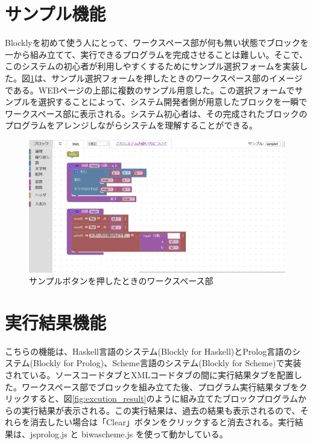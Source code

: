 \documentclass{risepaper}
\begin{document}
   \section{サンプル機能}
Blocklyを初めて使う人にとって、ワークスペース部が何も無い状態でブロックを一から組み立てて、実行できるプログラムを完成させることは難しい。そこで、このシステムの初心者が利用しやすくするためにサンプル選択フォームを実装した。図\ref{fig:sample}は、サンプル選択フォームを押したときのワークスペース部のイメージである。WEBページの上部に複数のサンプル用意した。この選択フォームでサンプルを選択することによって、システム開発者側が用意したブロックを一瞬でワークスペース部に表示される。システム初心者は、その完成されたブロックのプログラムをアレンジしながらシステムを理解することができる。

\begin{figure}[h]
\begin{center}
\includegraphics[scale=0.5]{img/sample.PNG}
\caption{サンプルボタンを押したときのワークスペース部}%
\label{fig:sample}
\end{center}%
\end{figure}%

   \section{実行結果機能}
   
こちらの機能は、Haskell言語のシステム(Blockly for Haskell)とProlog言語のシステム(Blockly for Prolog)、Scheme言語のシステム(Blockly for Scheme)で実装されている。ソースコードタブとXMLコードタブの間に実行結果タブを配置した。ワークスペース部でブロックを組み立てた後、プログラム実行結果タブをクリックすると、図\ref{fig:excution_result}のように組み立てたブロックプログラムからの実行結果が表示される。この実行結果は、過去の結果も表示されるので、それらを消去したい場合は「Clear」ボタンをクリックすると消去される。実行結果は、jsprolog.js と biwascheme.js を使って動かしている。
\end{document}
